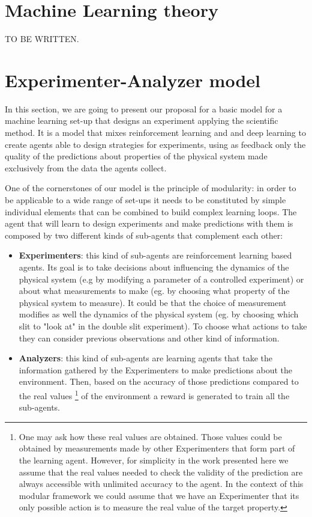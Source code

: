 \documentclass[11pt,a4paper,twoside]{report}
\newcommand{\+}{\textnormal{+} }
\theoremstyle{definition}
\numberwithin{equation}{chapter}
\begin{document}
\chapter{Machine Learning theory} 

TO BE WRITTEN.

\chapter{Experimenter-Analyzer model}

In this section, we are going to present our proposal for a basic model for a
machine learning set-up that designs an experiment applying the scientific
method. It is a model that mixes reinforcement learning and and deep learning to
create agents able to design strategies for experiments, using as feedback only
the quality of the predictions about properties of the physical system made
exclusively from the data the agents collect. 

One of the cornerstones of our model is the principle of modularity: in order to
be applicable to a wide range of set-ups it needs to be constituted by simple
individual elements that can be combined to build complex learning loops. The
agent that will learn to design experiments and make predictions with them is
composed by two different kinds of sub-agents that complement each other:

\begin{itemize}
  \item \textbf{Experimenters}: this kind of sub-agents are reinforcement
  learning based agents. Its goal is to take decisions about influencing the
  dynamics of the physical system (e.g by modifying a parameter of a controlled
  experiment) or about what measurements to make (eg. by choosing what property
  of the physical system to measure). It could be that the choice of
  measurement modifies as well the dynamics of the physical system (eg. by
  choosing which slit to "look at" in the double slit experiment). To choose
  what actions to take they can consider previous observations and other kind of 
  information.
  \item \textbf{Analyzers}: this kind of sub-agents are learning agents
  that take the information gathered by the Experimenters to make predictions
  about the environment. Then, based on the accuracy of those predictions
  compared to the real values \footnote{One may ask how these real values are
  obtained. Those values could be obtained by measurements made by other
  Experimenters that form part of the learning agent. However, for simplicity in
  the work presented here we assume that the real values needed to check the
  validity of the prediction are always accessible with unlimited accuracy to
  the agent. In the context of this modular framework we could assume that we
  have an Experimenter that its only possible action is to measure the real
  value of the target property.} of the environment a reward is generated to
  train all the sub-agents. 

\end{itemize}
\end{document}

